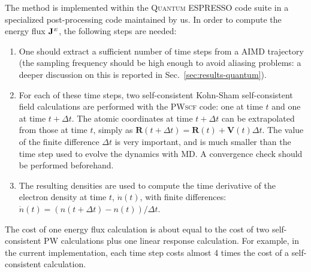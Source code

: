 The method is implemented within the \textsc{Quantum ESPRESSO} code suite \cite{Giannozzi2009,Giannozzi2017} in a specialized post-processing code maintained by us. 
In order to compute the energy flux $\mathbf{J}^{\scriptscriptstyle E}$, the following steps are needed: 
\begin{enumerate}
    \item One should extract a sufficient number of time steps from a AIMD trajectory (the sampling frequency should be high enough to avoid aliasing problems: a deeper discussion on this is reported in Sec.~\ref{sec:results-quantum}). 
    \item For each of these time steps, two self-consistent Kohn-Sham self-consistent field calculations are performed with the \textsc{PWscf} code: one at time $t$ and one at time $t+\Delta t$. The atomic coordinates at time $t+\Delta t$ can be extrapolated from those at time $t$, simply as $\mathbf{R}(t+\Delta t) = \mathbf{R}(t) + \mathbf{V}(t) \Delta t$. The value of the finite difference $\Delta t$ is very important, and is much smaller than the time step used to evolve the dynamics with MD. A convergence check should be performed beforehand.
    \item The resulting densities are used to compute the time derivative of the electron density at time $t$, $\dot{n}(t)$, with finite differences: $\dot{n}(t) = (n(t+\Delta t) - n(t))/\Delta t$.
\end{enumerate}
The cost of one energy flux calculation is about equal to the cost of two self-consistent \textsc{PW} calculations plus one linear response calculation. For example, in the current implementation, each time step costs almost 4 times the cost of a self-consistent calculation.





